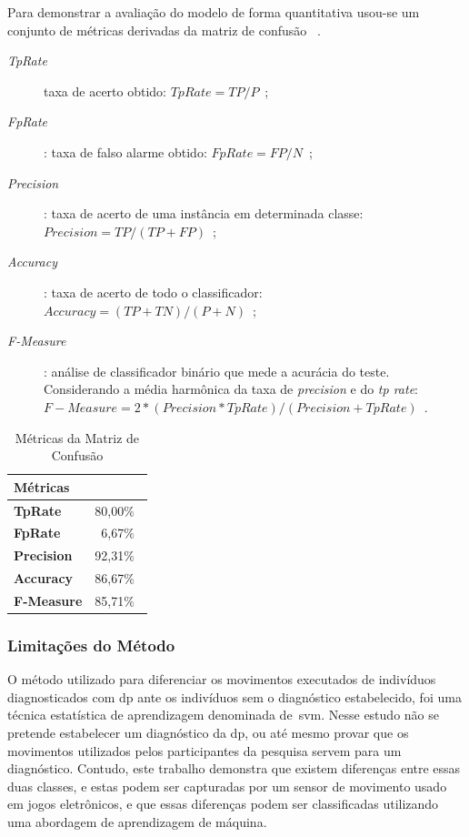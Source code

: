  Para demonstrar a avaliação do modelo de forma quantitativa usou-se um conjunto de métricas derivadas da matriz de confusão ~\cite{datamining2005}.
 \begin{description}
 	\item [\textit{TpRate}] taxa de acerto obtido: $ TpRate = TP/P $\ ;
 	\item [\textit{FpRate}]: taxa de falso alarme obtido: $ FpRate = FP/N $\ ;
 	\item [\textit{Precision}]: taxa de acerto de uma instância em determinada classe: $ Precision =  TP/(TP +FP) $\ ;
 	\item [\textit{Accuracy}]: taxa de acerto de todo o classificador: $ Accuracy = (TP+TN)/(P+N) $\ ;
 	\item [\textit{F-Measure}]: análise de classificador binário que mede a acurácia do teste. Considerando a média harmônica da taxa de \textit{precision} e do \textit{tp rate}: $ F-Measure = 2 * (Precision * TpRate)/(Precision + TpRate) $\ .
 \end{description}



\begin{table}[!htbp]
\label{table:metricasmatrizconfusao}
\caption{Métricas da Matriz de Confusão}
\centering
\begin{tabular}{|l|r|}








\hline
\multicolumn{2}{|l|}{\textbf{Métricas}} \\ \hline
\textbf{TpRate}                    & 80,00$\%$\                 \\ \hline
\textbf{FpRate}                    & 6,67$\%$\                \\ \hline
\textbf{Precision}                 & 92,31$\%$\                \\ \hline
\textbf{Accuracy}                  & 86,67$\%$\                \\ \hline
\textbf{F-Measure}                 & 85,71$\%$\                \\ \hline
\end{tabular}
\end{table}






\subsubsection{Limitações do Método}
O método utilizado para diferenciar os movimentos executados de indivíduos diagnosticados com \ac{dp} ante os indivíduos sem o diagnóstico estabelecido, foi uma técnica estatística de aprendizagem denominada de~\ac{svm}. Nesse estudo não se pretende estabelecer um diagnóstico da \ac{dp}, ou até mesmo provar que os movimentos utilizados pelos participantes da pesquisa servem para um diagnóstico. Contudo, este trabalho demonstra que existem diferenças entre essas duas classes, e estas podem ser capturadas por um sensor de movimento usado em jogos eletrônicos, e que essas diferenças podem ser classificadas utilizando uma abordagem de aprendizagem de máquina. 

